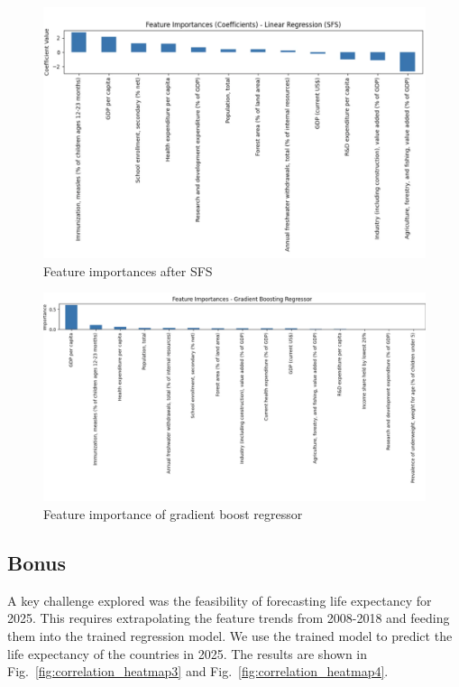 \documentclass{article}
\begin{document}
\begin{figure}[h]
    \centering
    \includegraphics[width=0.8\columnwidth]{./pic/T1.c.3.png} %
    \caption{Feature importances after SFS}
    \label{fig:aftersfs}
\end{figure}

\begin{figure}[h]
    \centering
    \includegraphics[width=0.8\columnwidth]{./pic/T1.c.4.png} %
    \caption{Feature importance of gradient boost regressor}
    \label{fig:correlation_heatmap2}
\end{figure}

\subsection*{Bonus}
A key challenge explored was the feasibility of forecasting life expectancy for 2025. 
This requires extrapolating the feature trends from 2008-2018 and feeding them into the trained regression model.
We use the trained model to predict the life expectancy of the countries in 2025.
The results are shown in Fig.~\ref{fig:correlation_heatmap3} and Fig.~\ref{fig:correlation_heatmap4}.
\end{document}
